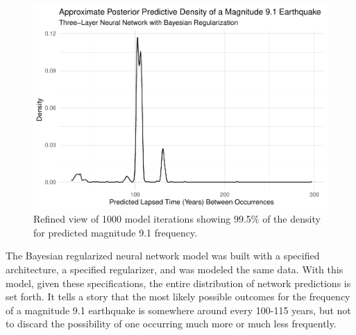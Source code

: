 \begin{figure}[H]
    \center
    \includegraphics[width=0.8\linewidth]{earthquakes_files/figure-latex/unnamed-chunk-16-2.pdf}
   \caption{\footnotesize{Refined view of 1000 model iterations showing 99.5\% of the density for predicted magnitude 9.1 frequency. }}
    \label{tohoku_ppd_1000}
\end{figure}

The Bayesian regularized neural network model was built with a specified architecture, a specified regularizer, and was modeled the same data.  With this model, given these specifications, the entire distribution of network predictions is set forth.  It tells a story that the most likely possible outcomes for the frequency of a magnitude 9.1 earthquake is somewhere around every 100-115 years, but not to discard the possibility of one occurring much more or much less frequently.